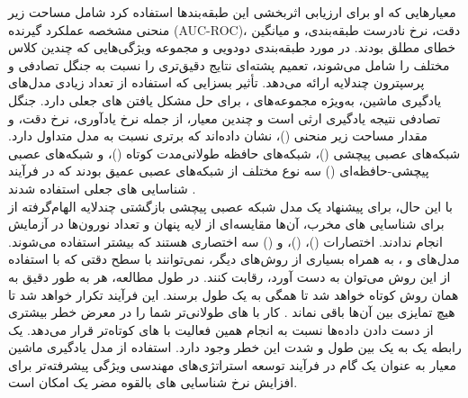\documentclass{CSICC2020}
\begin{document}
	معیارهایی که او برای ارزیابی اثربخشی این طبقه‌بندها استفاده کرد شامل مساحت زیر منحنی مشخصه عملکرد گیرنده (AUC-ROC)، دقت، نرخ نادرست طبقه‌بندی، و میانگین خطای مطلق بودند. در مورد طبقه‌بندی دودویی و مجموعه ویژگی‌هایی که چندین کلاس مختلف را شامل می‌شوند، تعمیم پشته‌ای نتایج دقیق‌تری را نسبت به جنگل تصادفی و پرسپترون چندلایه ارائه می‌دهد. تأثیر بسزایی که استفاده از تعداد زیادی مدل‌های یادگیری ماشین، به‌ویژه مجموعه‌های ، برای حل مشکل یافتن های جعلی دارد. جنگل تصادفی نتیجه یادگیری ارثی است و چندین معیار، از جمله نرخ یادآوری، نرخ دقت، و مقدار مساحت زیر منحنی ()، نشان داده‌اند که برتری نسبت به مدل  متداول دارد. شبکه‌های عصبی پیچشی ()، شبکه‌های حافظه طولانی‌مدت کوتاه ()، و شبکه‌های عصبی پیچشی-حافظه‌ای () سه نوع مختلف از شبکه‌های عصبی عمیق بودند که در فرآیند شناسایی های جعلی استفاده شدند \cite{rajalakshmi2019transfer}.\\
	
	با این حال، برای پیشنهاد یک مدل شبکه عصبی پیچشی بازگشتی چندلایه الهام‌گرفته از  برای شناسایی های مخرب، آن‌ها مقایسه‌ای از لایه پنهان و تعداد نورون‌ها در آزمایش انجام ندادند. اختصارات ()، ()، و () سه اختصاری هستند که بیشتر استفاده می‌شوند. مدل‌های  و ، به همراه بسیاری از روش‌های دیگر، نمی‌توانند با سطح دقتی که با استفاده از این روش می‌توان به دست آورد، رقابت کنند. در طول مطالعه، هر  به طور دقیق به همان روش کوتاه خواهد شد تا همگی به یک طول برسند. این فرآیند تکرار خواهد شد تا هیچ تمایزی بین آن‌ها باقی نماند \cite{wejinya2021machine}. کار با های طولانی‌تر شما را در معرض خطر بیشتری از دست دادن داده‌ها نسبت به انجام همین فعالیت با های کوتاه‌تر قرار می‌دهد. یک رابطه یک به یک بین طول  و شدت این خطر وجود دارد. استفاده از مدل یادگیری ماشین معیار به عنوان یک گام در فرآیند توسعه استراتژی‌های مهندسی ویژگی پیشرفته‌تر برای افزایش نرخ شناسایی های بالقوه مضر یک امکان است.\\
	
\end{document}
